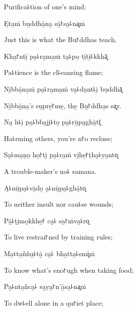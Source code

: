 \begin{english}
  Purifica꜕tion of one's mind:
\end{english}

E̱ta̱ṁ bu̱ddhā̱na̮ sā̱꜓sa̮꜕na͓ṁ

\begin{english}
  Just this is what the Bu꜓ddhas teach.
\end{english}

Kha̱꜓ntī̱ pa̮꜕ra̮ma̱ṁ ta̮꜕po̱ tī̱ti̱꜕kkhā͓

\begin{english}
  Pa꜕tience is the cl꜕eansing flame;
\end{english}

Ni̱bbā̱na̱ṁ pa̮꜕ra̮ma̱ṁ va̮꜕da̱nt꜕i̮ bu̱ddhā͓

\begin{english}
  Ni̱bbā̱na̱'s su̱pre̱꜓me̱, the̱ Bu̱꜓ddha̱s sa͓y.
\end{english}

Na̮ h꜕i̮ pa̱꜕bba̮ji̮꜕to̱ pa̮꜕rū̱pa̮ghā̱tī͓

\begin{english}
  Ha꜕rming others, you're n꜓o recluse;
\end{english}

Sa̮꜕ma̮ṇo̱ ho̱꜓ti̮ pa̮꜕ra̱ṁ vi̮he̱꜓ṭha̮꜕ya̱nto͓

\begin{english}
  A trouble-maker's no꜕ samana.
\end{english}

A̮꜕nū̱pa̮꜕vā̱do̱ a̮꜕nū̱pa̮꜕ghā̱to͓

\begin{english}
  To neither insult nor cau꜕se wounds;
\end{english}

Pā̱꜕ṭi̮mo̱kkhe̱꜓ ca̮꜕ sa̱꜓ṁva̮꜕ro͓

\begin{english}
  To live restrai꜓ned by training rules;
\end{english}

Ma̱tta̱ññu̮꜕tā̱ ca̮꜕ bha̱tta̱꜕smi͓ṁ

\begin{english}
  To know what's eno꜓ugh when taking food;
\end{english}

Pa̱꜕nta̱ñca̮꜕ sa̮ya̮꜓n'ā̱sa̮꜕na͓ṁ

\begin{english}
  To dw꜕ell alone in a qu꜓iet place;
\end{english}

